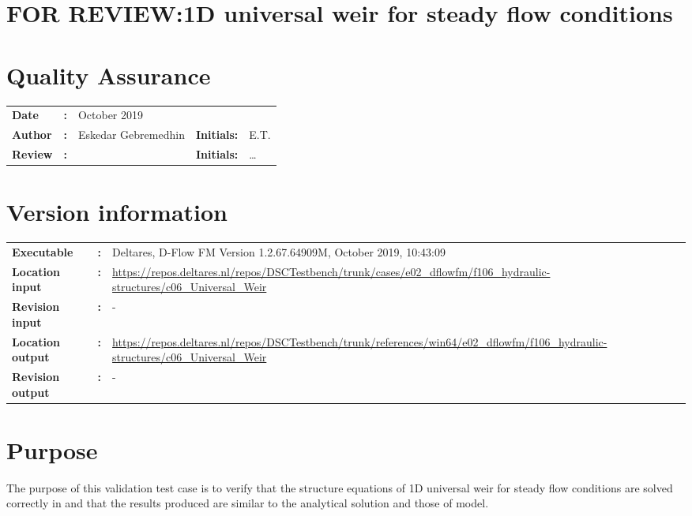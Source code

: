 

\section{FOR REVIEW:1D universal weir for steady flow conditions}
\newrefsegment

\section*{Quality Assurance}
\begin{tabular}{@{}p{27mm}@{}p{0mm}p{\textwidth-52mm-48pt}p{15mm}p{10mm}}
\textbf{Date} & \textbf{:} & October 2019   \\ 
\textbf{Author} & \textbf{:} & Eskedar Gebremedhin  & \textbf{Initials:} & E.T. \\
\textbf{Review} & \textbf{:} &   & \textbf{Initials:} & \ldots 
\end{tabular}

\section*{Version information}
{{
\begin{tabular}{@{}p{27mm}@{}p{0mm}p{\textwidth-27mm-24pt}}
\textbf{Executable}   & \textbf{:} & Deltares, D-Flow FM Version 1.2.67.64909M, October 2019, 10:43:09  \\
\textbf{Location input}     & \textbf{:} & \url{https://repos.deltares.nl/repos/DSCTestbench/trunk/cases/e02_dflowfm/f106_hydraulic-structures/c06_Universal_Weir} \\
\textbf{Revision input} & \textbf{:} & - \\
\textbf{Location output}     & \textbf{:} & \url{https://repos.deltares.nl/repos/DSCTestbench/trunk/references/win64/e02_dflowfm/f106_hydraulic-structures/c06_Universal_Weir} \\
\textbf{Revision output} & \textbf{:} & -
\end{tabular}
}}

\section*{Purpose}
The purpose of this validation test case is to verify that the structure equations of 1D universal weir for steady flow conditions are solved correctly in \dflowfmfull and that the results produced are similar to the analytical solution and those of \sobekthree model.

